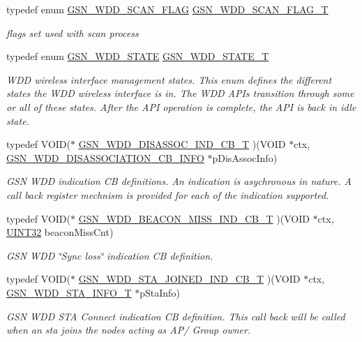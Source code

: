 \begin{DoxyCompactItemize}
typedef enum \hyperlink{a00677_gaa5a68f88cc724016ff0334f21c0dd120}{GSN\_\-WDD\_\-SCAN\_\-FLAG} \hyperlink{a00677_gad988da580b33f4a18de188de56a05736}{GSN\_\-WDD\_\-SCAN\_\-FLAG\_\-T}
\begin{DoxyCompactList}\small\item\em flags set used with scan process \end{DoxyCompactList}\item 
typedef enum \hyperlink{a00677_ga235b17af49bd1a1dc55715a7809b24ff}{GSN\_\-WDD\_\-STATE} \hyperlink{a00677_ga3a801c5847114c1bb6dc9cc1a0c5837e}{GSN\_\-WDD\_\-STATE\_\-T}
\begin{DoxyCompactList}\small\item\em WDD wireless interface management states. This enum defines the different states the WDD wireless interface is in. The WDD APIs transition through some or all of these states. After the API operation is complete, the API is back in idle state. \end{DoxyCompactList}\item 
typedef VOID($\ast$ \hyperlink{a00677_gadb536a5e296beff888ffe8f4cdc68507}{GSN\_\-WDD\_\-DISASSOC\_\-IND\_\-CB\_\-T} )(VOID $\ast$ctx, \hyperlink{a00379}{GSN\_\-WDD\_\-DISASSOCIATION\_\-CB\_\-INFO} $\ast$pDisAssocInfo)
\begin{DoxyCompactList}\small\item\em GSN WDD indication CB definitions. An indication is asychronous in nature. A call back register mechnism is provided for each of the indication supported. \end{DoxyCompactList}\item 
typedef VOID($\ast$ \hyperlink{a00677_ga6b4e6d07b52788c8ddf01ddaa89429ad}{GSN\_\-WDD\_\-BEACON\_\-MISS\_\-IND\_\-CB\_\-T} )(VOID $\ast$ctx, \hyperlink{a00660_gae1e6edbbc26d6fbc71a90190d0266018}{UINT32} beaconMissCnt)
\begin{DoxyCompactList}\small\item\em GSN WDD \char`\"{}Sync loss\char`\"{} indication CB definition. \end{DoxyCompactList}\item 
typedef VOID($\ast$ \hyperlink{a00677_ga607917e8bad21deeb1564d9455d46f28}{GSN\_\-WDD\_\-STA\_\-JOINED\_\-IND\_\-CB\_\-T} )(VOID $\ast$ctx, \hyperlink{a00299}{GSN\_\-WDD\_\-STA\_\-INFO\_\-T} $\ast$pStaInfo)
\begin{DoxyCompactList}\small\item\em GSN WDD STA Connect indication CB definition. This call back will be called when an sta joins the nodes acting as AP/ Group owner. \end{DoxyCompactList}\item 

\end{DoxyCompactItemize}
